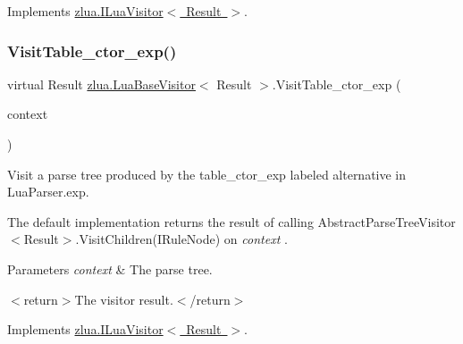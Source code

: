 Implements \mbox{\hyperlink{interfacezlua_1_1_i_lua_visitor_a03f9e5eb30ac270a1efa99bfe98e2f96}{zlua.\+I\+Lua\+Visitor$<$ Result $>$}}.

\mbox{\label{classzlua_1_1_lua_base_visitor_a074674e65df701a19707c8c7d32e7aec}} 
\subsubsection{\texorpdfstring{Visit\+Table\+\_\+ctor\+\_\+exp()}{VisitTable\_ctor\_exp()}}
{\footnotesize\ttfamily virtual Result \mbox{\hyperlink{classzlua_1_1_lua_base_visitor}{zlua.\+Lua\+Base\+Visitor}}$<$ Result $>$.Visit\+Table\+\_\+ctor\+\_\+exp (\begin{DoxyParamCaption}\item[{\mbox{[}\+Not\+Null\mbox{]} \mbox{\hyperlink{classzlua_1_1_lua_parser_1_1_table__ctor__exp_context}{Lua\+Parser.\+Table\+\_\+ctor\+\_\+exp\+Context}}}]{context }\end{DoxyParamCaption})\hspace{0.3cm}{\ttfamily [virtual]}}



Visit a parse tree produced by the {\ttfamily table\+\_\+ctor\+\_\+exp} labeled alternative in Lua\+Parser.\+exp. 

The default implementation returns the result of calling Abstract\+Parse\+Tree\+Visitor$<$\+Result$>$.\+Visit\+Children(\+I\+Rule\+Node) on {\itshape context} . 


\begin{DoxyParams}{Parameters}
{\em context} & The parse tree.\\
\hline
\end{DoxyParams}
$<$return$>$The visitor result.$<$/return$>$ 

Implements \mbox{\hyperlink{interfacezlua_1_1_i_lua_visitor_a0a1b5d873890318ed0259f93eac4a5b7}{zlua.\+I\+Lua\+Visitor$<$ Result $>$}}.

\mbox{\label{classzlua_1_1_lua_base_visitor_a3af0cdb6e39f83c4cd04b9a309b9f130}} 

